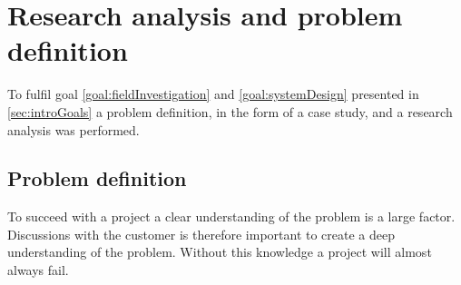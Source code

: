 \section{Research analysis and problem definition}\label{sec:methodProblemDefinition}






To fulfil goal \ref{goal:fieldInvestigation} and \ref{goal:systemDesign} presented in \cref{sec:introGoals} a problem definition, in the form of a case study, and a research analysis was performed.

\subsection{Problem definition}\label{sec:methodProblemDefinition}
To succeed with a project a clear understanding of the problem is a large factor.
Discussions with the customer is therefore important to create a deep understanding of the problem.
Without this knowledge a project will almost always fail.
\cite{SecretsSuccessfulSimulation1995}

